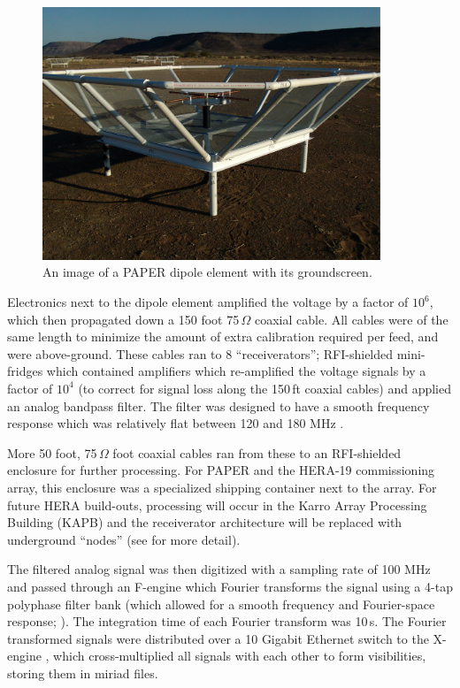 \begin{figure}
\centering
\includegraphics[width=0.9\textwidth]{chapters/instruments/figures/PAPER_dipole.pdf}
\caption{An image of a PAPER dipole element with its groundscreen.}
\label{fig:instruments_PAPER_element}
\end{figure}


Electronics next to the dipole element amplified the voltage by a factor of $10^6$, which then propagated down a 150 foot 75\,$\Omega$ coaxial cable. All cables were of the same length to minimize the amount of extra calibration required per feed, and were above-ground. These cables ran to 8 ``receiverators''; RFI-shielded mini-fridges which contained amplifiers which re-amplified the voltage signals by a factor of $10^4$  (to correct for signal loss along the 150\,ft coaxial cables) and applied an analog bandpass filter. The filter was designed to have a smooth frequency response which was relatively flat between 120 and 180 MHz \citep[e.g.][]{MooreThesis}.

More 50 foot, 75\,$\Omega$ foot coaxial cables ran from these to an RFI-shielded enclosure for further processing. For PAPER and the HERA-19 commissioning array, this enclosure was a specialized shipping container next to the array. For future HERA build-outs, processing will occur in the Karro Array Processing Building (KAPB) and the receiverator architecture will be replaced with underground ``nodes'' (see \citet{deBoer.17} for more detail).

The filtered analog signal was then digitized with a sampling rate of 100 MHz and passed through an F-engine which Fourier transforms the signal using a 4-tap polyphase filter bank (which allowed for a smooth frequency and Fourier-space response; \citet{PricePFB}). The integration time of each Fourier transform was 10\,s. The Fourier transformed signals were distributed over a 10 Gigabit Ethernet switch to the X-engine \citep{Parsons.08}, which cross-multiplied all signals with each other to form visibilities, storing them in {\sc miriad} files.

